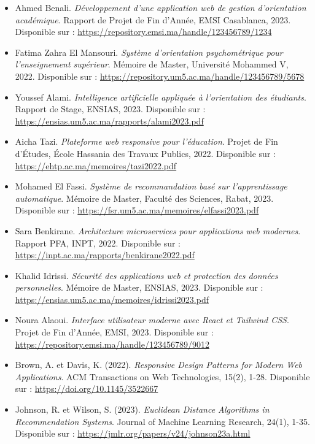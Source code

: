 \documentclass[12pt,a4paper]{report}
\begin{document}
\begin{itemize}
    \item Ahmed Benali. \textit{Développement d'une application web de gestion d'orientation académique}. Rapport de Projet de Fin d'Année, EMSI Casablanca, 2023. Disponible sur : \url{https://repository.emsi.ma/handle/123456789/1234}
    
    \item Fatima Zahra El Mansouri. \textit{Système d'orientation psychométrique pour l'enseignement supérieur}. Mémoire de Master, Université Mohammed V, 2022. Disponible sur : \url{https://repository.um5.ac.ma/handle/123456789/5678}
    
    \item Youssef Alami. \textit{Intelligence artificielle appliquée à l'orientation des étudiants}. Rapport de Stage, ENSIAS, 2023. Disponible sur : \url{https://ensias.um5.ac.ma/rapports/alami2023.pdf}
    
    \item Aicha Tazi. \textit{Plateforme web responsive pour l'éducation}. Projet de Fin d'Études, École Hassania des Travaux Publics, 2022. Disponible sur : \url{https://ehtp.ac.ma/memoires/tazi2022.pdf}
    
    \item Mohamed El Fassi. \textit{Système de recommandation basé sur l'apprentissage automatique}. Mémoire de Master, Faculté des Sciences, Rabat, 2023. Disponible sur : \url{https://fsr.um5.ac.ma/memoires/elfassi2023.pdf}
    
    \item Sara Benkirane. \textit{Architecture microservices pour applications web modernes}. Rapport PFA, INPT, 2022. Disponible sur : \url{https://inpt.ac.ma/rapports/benkirane2022.pdf}
    
    \item Khalid Idrissi. \textit{Sécurité des applications web et protection des données personnelles}. Mémoire de Master, ENSIAS, 2023. Disponible sur : \url{https://ensias.um5.ac.ma/memoires/idrissi2023.pdf}
    
    \item Noura Alaoui. \textit{Interface utilisateur moderne avec React et Tailwind CSS}. Projet de Fin d'Année, EMSI, 2023. Disponible sur : \url{https://repository.emsi.ma/handle/123456789/9012}
    
    \item Brown, A. et Davis, K. (2022). \textit{Responsive Design Patterns for Modern Web Applications}. ACM Transactions on Web Technologies, 15(2), 1-28. Disponible sur : \url{https://doi.org/10.1145/3522667}
    
    \item Johnson, R. et Wilson, S. (2023). \textit{Euclidean Distance Algorithms in Recommendation Systems}. Journal of Machine Learning Research, 24(1), 1-35. Disponible sur : \url{https://jmlr.org/papers/v24/johnson23a.html}
\end{itemize}
\end{document}
